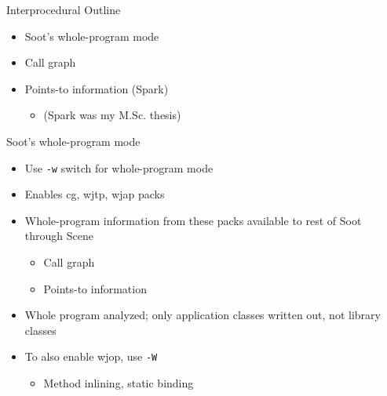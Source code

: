 \begin{slide}{Interprocedural Outline}
\begin{itemize}
\item Soot's whole-program mode
\item Call graph
\item Points-to information (Spark)
\begin{itemize}
\item (Spark was my M.Sc. thesis)
\end{itemize}
\end{itemize}
\end{slide}

\begin{slide}{Soot's whole-program mode}
\begin{itemize}
\item Use \texttt{-w} switch for whole-program mode
\item Enables cg, wjtp, wjap packs
\item Whole-program information from these packs available to rest of Soot through Scene
\begin{itemize}
\item Call graph
\item Points-to information
\end{itemize}
\item Whole program analyzed; only application classes written out, not library classes
\item To also enable wjop, use \texttt{-W}
\begin{itemize}
\item Method inlining, static binding
\end{itemize}
\end{itemize}
\end{slide}





